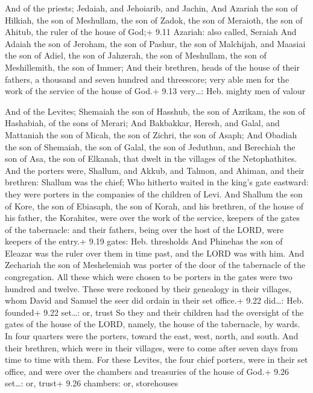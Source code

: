  And of the priests; Jedaiah, and Jehoiarib, and Jachin,
 And Azariah the son of Hilkiah, the son of Meshullam, the
son of Zadok, the son of Meraioth, the son of Ahitub, the ruler of the
house of God;+ 9.11 Azariah: also called, Seraiah  And
Adaiah the son of Jeroham, the son of Pashur, the son of Malchijah, and
Maasiai the son of Adiel, the son of Jahzerah, the son of Meshullam, the
son of Meshillemith, the son of Immer;  And their brethren,
heads of the house of their fathers, a thousand and seven hundred and
threescore; very able men for the work of the service of the house of
God.+ 9.13 very\ldots: Heb. mighty men of valour

 And of the Levites; Shemaiah the son of Hasshub, the son
of Azrikam, the son of Hashabiah, of the sons of Merari; 
And Bakbakkar, Heresh, and Galal, and Mattaniah the son of Micah, the
son of Zichri, the son of Asaph;  And Obadiah the son of
Shemaiah, the son of Galal, the son of Jeduthun, and Berechiah the son
of Asa, the son of Elkanah, that dwelt in the villages of the
Netophathites.  And the porters were, Shallum, and Akkub,
and Talmon, and Ahiman, and their brethren: Shallum was the chief;
 Who hitherto waited in the king's gate eastward: they were
porters in the companies of the children of Levi.  And
Shallum the son of Kore, the son of Ebiasaph, the son of Korah, and his
brethren, of the house of his father, the Korahites, were over the work
of the service, keepers of the gates of the tabernacle: and their
fathers, being over the host of the LORD, were keepers of the entry.+
9.19 gates: Heb. thresholds  And Phinehas the son of
Eleazar was the ruler over them in time past, and the LORD was with him.
 And Zechariah the son of Meshelemiah was porter of the
door of the tabernacle of the congregation.  All these
which were chosen to be porters in the gates were two hundred and
twelve. These were reckoned by their genealogy in their villages, whom
David and Samuel the seer did ordain in their set office.+ 9.22
did\ldots: Heb. founded+ 9.22 set\ldots: or, trust  So they
and their children had the oversight of the gates of the house of the
LORD, namely, the house of the tabernacle, by wards.  In
four quarters were the porters, toward the east, west, north, and south.
 And their brethren, which were in their villages, were to
come after seven days from time to time with them.  For
these Levites, the four chief porters, were in their set office, and
were over the chambers and treasuries of the house of God.+ 9.26
set\ldots: or, trust+ 9.26 chambers: or, storehouses

